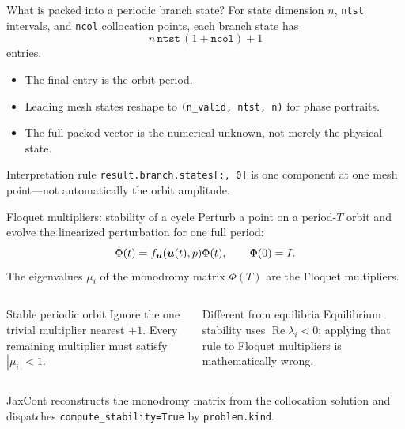 \begin{frame}{What is packed into a periodic branch state?}
For state dimension $n$, \texttt{ntst} intervals, and \texttt{ncol}
collocation points, each branch state has
\[
  n\,\texttt{ntst}\,(1+\texttt{ncol})+1
\]
entries.
\begin{center}
\end{center}
\begin{itemize}
  \item The final entry is the orbit period.
  \item Leading mesh states reshape to \texttt{(n\_valid, ntst, n)} for phase portraits.
  \item The full packed vector is the numerical unknown, not merely the physical state.
\end{itemize}
\begin{alertblock}{Interpretation rule}
\texttt{result.branch.states[:, 0]} is one component at one mesh point---not
automatically the orbit amplitude.
\end{alertblock}
\end{frame}

\begin{frame}{Floquet multipliers: stability of a cycle}
Perturb a point on a period-$T$ orbit and evolve the linearized perturbation
for one full period:
\[
  \dot\Phi(t)=f_{\bm{u}}(\bm{u}(t),p)\Phi(t),\qquad \Phi(0)=I.
\]
The eigenvalues $\mu_i$ of the monodromy matrix $\Phi(T)$ are the
\alert{Floquet multipliers}.
\begin{columns}[T]
\begin{block}{Stable periodic orbit}
Ignore the one trivial multiplier nearest $+1$. Every remaining multiplier
must satisfy $|\mu_i|<1$.
\end{block}
\begin{alertblock}{Different from equilibria}
Equilibrium stability uses $\operatorname{Re}\lambda_i<0$; applying that rule
to Floquet multipliers is mathematically wrong.
\end{alertblock}
\end{columns}
\vspace{2mm}
JaxCont reconstructs the monodromy matrix from the collocation solution and
dispatches \texttt{compute\_stability=True} by \texttt{problem.kind}.
\end{frame}

